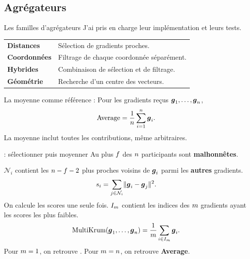 
\subsection{Agrégateurs}

\begin{frame}{Les familles d'agrégateurs}
    J'ai pris en charge leur implémentation et leurs tests.

    \medskip
    \begin{tabular}{@{}p{}p{}@{}}
        \textbf{Distances} & Sélection de gradients proches. \\[0.35em]
        \textbf{Coordonnées} & Filtrage de chaque coordonnée séparément. \\[0.35em]
        \textbf{Hybrides} & Combinaison de sélection et de filtrage. \\[0.35em]
        \textbf{Géométrie} & Recherche d'un centre des vecteurs.
    \end{tabular}

    \begin{block}{La moyenne comme référence : \average{}}
        Pour les gradients reçus $\boldsymbol{g}_1,\ldots,\boldsymbol{g}_{n}$,
        \[
            \operatorname{Average}=\frac{1}{n}
            \sum_{i=1}^{n}\boldsymbol{g}_i.
        \]
        La moyenne inclut toutes les contributions, même arbitraires.
    \end{block}
\end{frame}

\begin{frame}{\mkrum{} : sélectionner puis moyenner}
    Au plus $f$ des $n$ participants sont \textbf{malhonnêtes}.

    \medskip
    $\mathcal N_i$ contient les $n-f-2$ plus proches voisins
    de $\boldsymbol{g}_i$ parmi les \textbf{autres} gradients.
    \[
        s_i=\sum_{j\in\mathcal N_i}
        \lVert \boldsymbol{g}_i-\boldsymbol{g}_j \rVert^{2}.
    \]
    On calcule les scores une seule fois. $I_{m}$ contient les indices
    des $m$ gradients ayant les scores les plus faibles.
    \[
        \operatorname{MultiKrum}(\boldsymbol{g}_1,\ldots,\boldsymbol{g}_{n})
        =\frac{1}{m}\sum_{i\in I_{m}}\boldsymbol{g}_i.
    \]
    Pour $m=1$, on retrouve \textbf{\krum{}}.
    Pour $m=n$, on retrouve \textbf{Average}.
\end{frame}


